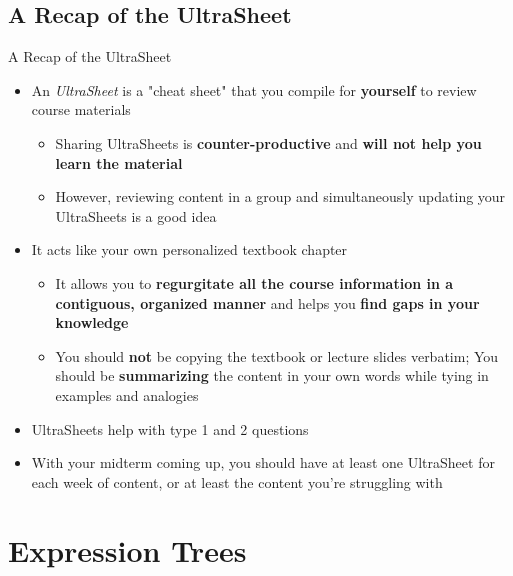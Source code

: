 \documentclass[hyperref={colorlinks,citecolor=blue,linkcolor=blue,urlcolor=blue}, aspectratio=1610]{beamer}
\begin{document}
\subsection{A Recap of the UltraSheet\texttrademark{}}
\begin{frame}{A Recap of the UltraSheet\texttrademark{}}
  \begin{itemize}
    \item An \textit{UltraSheet\texttrademark{}} is a "cheat sheet" that you compile for \textbf{yourself} to review course materials 
    \begin{itemize}
      \item Sharing UltraSheets\texttrademark{} is \textbf{counter-productive} and \textbf{will not help you learn the material}
      \item However, reviewing content in a group and simultaneously updating your UltraSheets\texttrademark{} is a good idea
    \end{itemize}
    \item It acts like your own personalized textbook chapter
    \begin{itemize}
      \item It allows you to \textbf{regurgitate all the course information in a contiguous, organized manner} and helps you \textbf{find gaps in your knowledge}
      \item You should \textbf{not} be copying the textbook or lecture slides verbatim; You should be \textbf{summarizing} the content in your own words while tying in examples and analogies
    \end{itemize}
    \item UltraSheets\texttrademark{} help with type 1 and 2 questions 
  \item With your midterm coming up, you should have at least one UltraSheet\texttrademark{} for each week of content, or at least the content you're struggling with
  \end{itemize}

\end{frame}

\section{Expression Trees}
\end{document}
